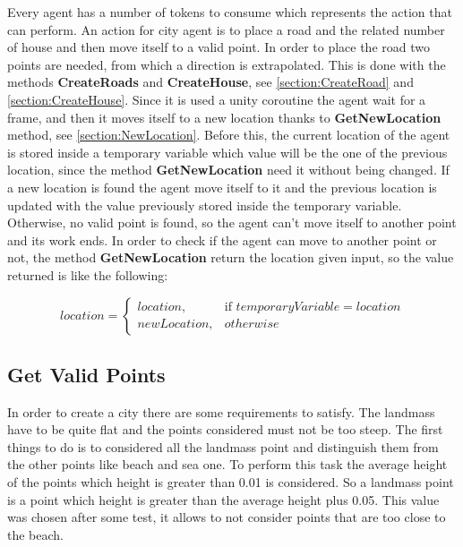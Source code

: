 \documentclass[12pt]{article}
\begin{document}
    Every agent has a number of tokens to consume which represents the action that can perform. An action for city agent is to place a road and the related number of
    house and then move itself to a valid point. In order to place the road two points are needed, from which a direction is extrapolated. This is done with the methods
    \textbf{CreateRoads} and \textbf{CreateHouse}, see \ref{section:CreateRoad} and \ref{section:CreateHouse}. Since it is used a unity coroutine the agent wait for a frame, and then 
    it moves itself to a new location thanks to \textbf{GetNewLocation} method, see \ref{section:NewLocation}. Before this, the current location of the agent
    is stored inside a temporary variable which value will be the one of the previous location, since the method \textbf{GetNewLocation} need it without being changed.
    If a new location is found the agent move itself to it and the previous location is updated with the value previously stored inside the temporary variable. Otherwise,
    no valid point is found, so the agent can't move itself to another point and its work ends. In order to check if the agent can move to another point or not, the 
    method \textbf{GetNewLocation} return the location given input, so the value returned is like the following:

    \begin{equation}
        location = \begin{cases} location, & \mbox{if } temporaryVariable { = location} \\ newLocation, & \mbox{} otherwise\  \end{cases}
    \end{equation}

    \subsection{Get Valid Points} \label{section: ValidPoints}
    In order to create a city there are some requirements to satisfy. The landmass have to be quite flat and the points considered must not be too steep.
    The first things to do is to considered all the landmass point and distinguish them from the other points like beach and sea one. To perform this task the
    average height of the points which height is greater than 0.01 is considered. So a landmass point is a point which height is greater than the average height plus
    0.05. This value was chosen after some test, it allows to not consider points that are too close to the beach. 
\end{document}
